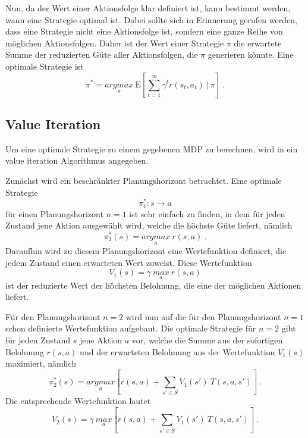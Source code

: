 \documentclass[a4paper]{IEEEtran}
\def\E{\mathrm{E}} %
\begin{document}
Nun, da der Wert einer Aktionsfolge klar definiert ist, kann bestimmt werden, wann eine Strategie optimal ist. Dabei sollte sich in Erinnerung gerufen werden, dass eine Strategie nicht eine Aktionsfolge ist, sondern eine ganze Reihe von möglichen Aktionsfolgen. Daher ist der Wert einer Strategie $\pi$ die erwartete Summe der reduzierten Güte aller Aktionsfolgen, die $\pi$ generieren könnte. Eine optimale Strategie ist
\begin{equation}
	\pi^* = \underset{\pi}{argmax}\ \E \left[ \sum\limits_{t=1}^{\infty} \gamma^t r(s_t, a_t) \ \vert\ \pi \right]\ .
\end{equation}

\subsection{Value Iteration}
\label{sec:valueIteration}
Um eine optimale Strategie zu einem gegebenen MDP zu berechnen, wird in \cite{thrun2005probabilistic} ein value iteration Algorithmus angegeben. 

Zunächst wird ein beschränkter Planungshorizont betrachtet. Eine optimale Strategie 
\begin{equation}
	\pi_1^*: s \rightarrow a
\end{equation}
für einen Planungshorizont $n=1$ ist sehr einfach zu finden, in dem für jeden Zustand jene Aktion ausgewählt wird, welche die höchste Güte liefert, nämlich
\begin{equation}
	\pi_1^*(s)= \underset{a}{argmax}\ r(s, a)\ .
\end{equation}
Daraufhin wird zu diesem Planungshorizont eine Wertefunktion definiert, die jedem Zustand einen erwarteten Wert zuweist. Diese Wertefunktion
\begin{equation}
	V_1(s) = \gamma\ \underset{a}{max}\ r(s, a)
\end{equation}
ist der reduzierte Wert der höchsten Belohnung, die eine der möglichen Aktionen liefert.

Für den Planungshorizont $n=2$ wird nun auf die für den Planungshorizont $n=1$ schon definierte Wertefunktion aufgebaut. Die optimale Strategie für $n=2$ gibt für jeden Zustand $s$ jene Aktion $a$ vor, welche die Summe aus der sofortigen Belohnung $r(s,a)$ und der erwarteten Belohnung aus der Wertefunktion $V_1(s)$ maximiert, nämlich
\begin{equation}
	\pi_2^*(s) = \underset{a}{argmax} \left[ r(s,a) + \sum_{s' \in S} V_1(s')\ T(s, a, s') \right]\ .
\end{equation}
Die entsprechende Wertefunktion lautet
\begin{equation}
	V_2(s) = \gamma\ \underset{a}{max} \left[ r(s,a) + \sum_{s' \in S} V_1(s')\ T(s, a, s') \right]\ .
\end{equation}
\end{document}
